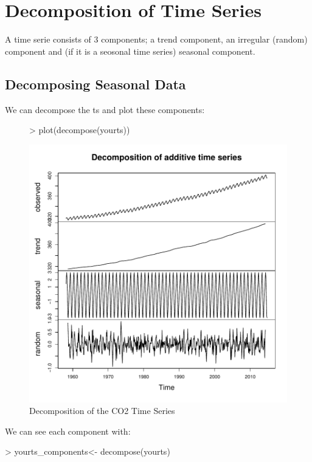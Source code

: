 \documentclass[11pt, a4paper]{article} %
\begin{document}
\section{Decomposition of Time Series}%
A time serie consists of 3 components; a trend component, an irregular (random) component and (if it is a seosonal time series) seasonal component.
\subsection{Decomposing Seasonal Data}%
\noindent We can decompose the ts and plot these components:
\begin{figure}[H]
\centering
\begin{Schunk}
\begin{Sinput}
> plot(decompose(yourts))
\end{Sinput}
\end{Schunk}
\includegraphics{alleselena-decompose}
\caption{Decomposition of the CO2 Time Series}
\end{figure}
\noindent We can see each component with:
\begin{Schunk}
\begin{Sinput}
> yourts_components<- decompose(yourts)
\end{Sinput}
\end{Schunk}
\end{document}
